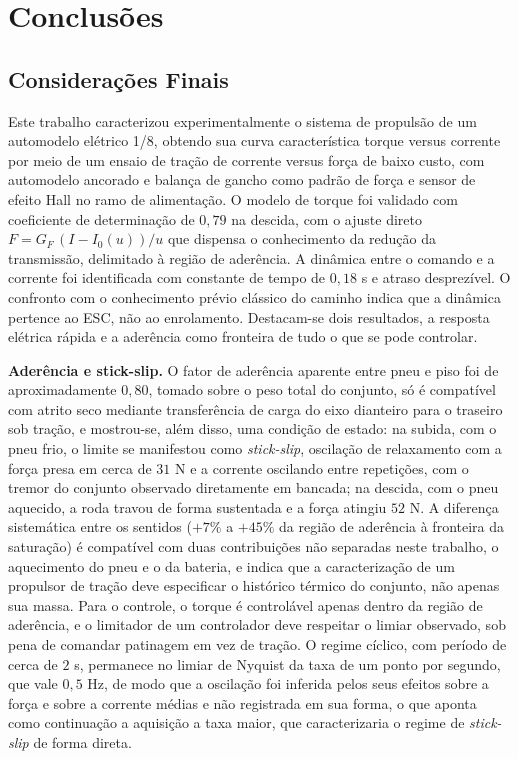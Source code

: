 \chapter{Conclusões}
\label{chap:conclusao}

\section{Considerações Finais}

Este trabalho caracterizou experimentalmente o sistema de propulsão de um automodelo
elétrico 1/8, obtendo sua curva característica torque versus corrente por meio de um ensaio
de tração de corrente versus força de baixo custo, com automodelo ancorado e balança de gancho
como padrão de força e sensor de efeito Hall no ramo de alimentação. O modelo de torque foi
validado com coeficiente de determinação de $0{,}79$ na descida, com o ajuste direto
$F = G_F\,(I - I_0(u))/u$ que dispensa o conhecimento da redução da transmissão,
delimitado à região de
aderência. A dinâmica entre o comando e a corrente foi identificada com constante de tempo de
$0{,}18$ s e atraso desprezível. O confronto com o conhecimento prévio clássico do caminho
indica que a dinâmica pertence ao ESC, não ao enrolamento. Destacam-se dois resultados, a
resposta elétrica rápida e a aderência como fronteira de tudo o que se pode controlar.

\textbf{Aderência e stick-slip.} O fator de aderência aparente entre pneu e piso foi de
aproximadamente $0{,}80$, tomado sobre o peso total do conjunto, só é compatível com atrito
seco mediante transferência de carga do eixo dianteiro para o traseiro sob tração, e
mostrou-se, além disso, uma condição de estado: na subida, com o pneu frio, o limite se
manifestou como \emph{stick-slip}, oscilação de relaxamento com a força presa em cerca de
$31$ N e a corrente oscilando entre repetições, com o tremor do conjunto observado
diretamente em bancada; na descida, com o pneu aquecido, a roda travou de forma sustentada e
a força atingiu $52$ N. A diferença sistemática entre os sentidos ($+7\%$ a $+45\%$ da região de
aderência à fronteira da saturação) é compatível com duas contribuições não separadas neste trabalho, o
aquecimento do pneu e o da bateria, e indica que a caracterização de um propulsor de
tração deve especificar o histórico térmico do conjunto, não apenas sua massa. Para o
controle, o torque é controlável apenas dentro da região de aderência, e o limitador de um
controlador deve respeitar o limiar observado, sob pena de comandar
patinagem em vez de tração. O regime cíclico, com período de cerca de $2$ s, permanece no
limiar de Nyquist da taxa de um ponto por segundo, que vale $0{,}5$ Hz, de modo que a
oscilação foi inferida pelos seus efeitos sobre a força e sobre a corrente médias e não
registrada em sua forma, o que aponta como continuação a aquisição a taxa maior, que
caracterizaria o regime de \emph{stick-slip} de forma direta.

